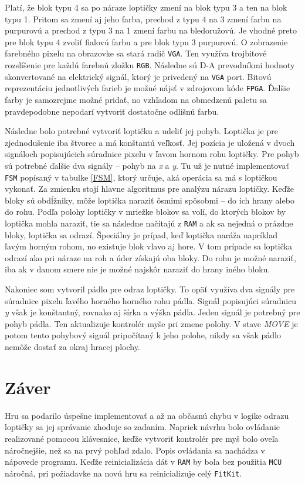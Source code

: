 \documentclass[12pt,a4paper,titlepage,final]{article}
\begin{document}
Platí, že blok typu 4 sa po náraze loptičky zmení na blok typu 3 a ten na blok typu 1. Pritom sa zmení aj jeho farba, prechod
z typu 4 na 3 zmení farbu na purpurovú a prechod z typu 3 na 1 zmení farbu na bledoružovú. Je vhodné preto pre blok typu 4 zvoliť
fialovú farbu a pre blok typu 3 purpurovú.
O zobrazenie farebného pixelu na obrazovke sa stará radič \texttt{VGA}. Ten využíva trojbitové rozslíšenie
pre každú farebnú zložku \texttt{RGB}. Následne sú D-A prevodníkmi hodnoty skonvertované na elektrický signál, ktorý je privedený
na \texttt{VGA} port. Bitovú reprezentáciu jednotlivých farieb je možné nájsť v zdrojovom kóde \texttt{FPGA}.
Ďalšie farby je samozrejme možné pridať, no vzhľadom na obmedzenú paletu sa pravdepodobne nepodarí vytvoriť dostatočne odlišnú farbu.

Následne bolo potrebné vytvoriť loptičku a udeliť jej pohyb. Loptička je pre zjednodušenie iba štvorec a má konštantú veľkosť.
Jej pozícia je uložená v dvoch signáloch popisujúcich súradnice pixelu v ľavom hornom rohu loptičky. Pre pohyb sú potrebné
ďalšie dva signály -- pohyb na \emph{x} a \emph{y}. Tu už je nutné implementovať \texttt{FSM} popísaný v tabulke \ref{FSM}, ktorý určuje, aká operácia
sa má s loptičkou vykonať. Za zmienku stojí hlavne algoritmus pre analýzu nárazu loptičky. Keďže bloky sú obdĺžniky, môže 
loptička naraziť ôsmimi spôsobmi -- do ich hrany alebo do rohu. Podľa polohy loptičky v mriežke blokov sa volí, do ktorých
blokov by loptička mohla naraziť, tie sa následne načítajú z \texttt{RAM} a ak sa nejedná o prázdne bloky, loptička sa odrazí.
Špeciálny je prípad, keď loptička naráža napríklad ľavým horným rohom, no existuje blok vlavo aj hore. V tom prípade
sa loptička odrazí ako pri náraze na roh a úder získajú oba bloky. Do rohu je možné naraziť, iba ak v danom smere nie je
možné najskôr naraziť do hrany iného bloku. 

Nakoniec som vytvoril pádlo pre odraz loptičky. To opäť využíva dva signály pre súradnice pixelu ľavého horného
horného rohu pádla. Signál popisujúci súradnicu \emph{y} však je konštantný, rovnako aj šírka a výška pádla. Jeden signál je
potrebný pre pohyb pádla. Ten aktualizuje kontrolér myše pri zmene polohy. V stave \emph{MOVE} je potom tento pohybový signál
pripočítaný k jeho polohe, nikdy sa však pádlo nemôže dostať za okraj hracej plochy. 

\section{Záver} \label{zaver}
Hru sa podarilo úspešne implementovať a až na občasnú chybu v logike odrazu loptičky sa jej správanie zhoduje so zadaním.
Napriek návrhu bolo ovládanie realizované pomocou klávesnice, keďže vytvoriť kontrolér pre myš bolo oveľa náročnejšie, 
než sa na prvý pohľad zdalo. Popis ovládania sa nachádza v nápovede programu.
Keďže reinicializácia dát v \texttt{RAM} by bola bez použitia \texttt{MCU} náročná, pri požiadavke na novú hru sa reinicializuje
celý \texttt{FitKit}.
\end{document}
